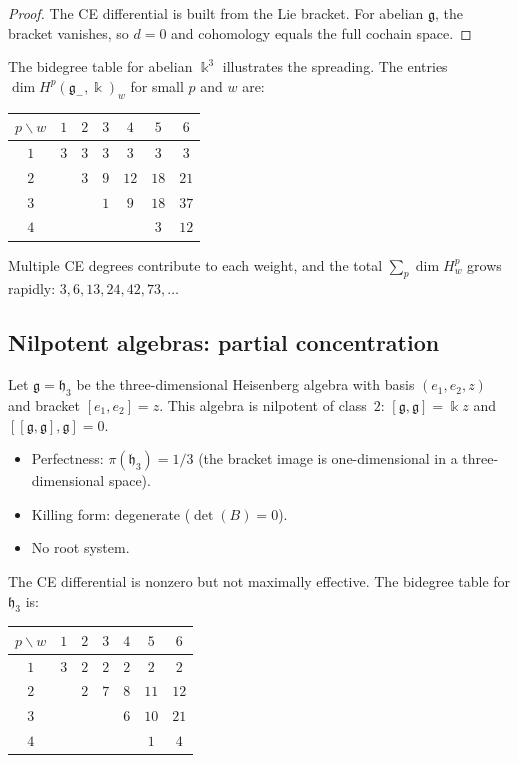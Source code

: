 \documentclass[11pt,reqno]{amsart}
\theoremstyle{plain}
\theoremstyle{definition}
\theoremstyle{remark}
\newcommand{\fg}{\mathfrak{g}}
\newcommand{\fh}{\mathfrak{h}}
\newcommand{\gminus}{\fg_{-}}
\newcommand{\kk}{\Bbbk}
\begin{document}
\begin{proof}
 The CE differential is built from the Lie bracket. For abelian $\fg$,
 the bracket vanishes, so $d = 0$ and cohomology equals the full cochain
 space.
\end{proof}

The bidegree table for abelian $\kk^3$ illustrates the spreading. The
entries $\dim H^p(\gminus,\kk)_w$ for small $p$ and $w$ are:

\begin{center}
 \begin{tabular}{c|cccccc}
 \toprule
 $p \backslash w$ & $1$ & $2$ & $3$ & $4$ & $5$ & $6$ \\
 \midrule
 $1$ & $3$ & $3$ & $3$ & $3$ & $3$ & $3$ \\
 $2$ & & $3$ & $9$ & $12$ & $18$ & $21$ \\
 $3$ & & & $1$ & $9$ & $18$ & $37$ \\
 $4$ & & & & & $3$ & $12$ \\
 \bottomrule
 \end{tabular}
\end{center}

\noindent
Multiple CE degrees contribute to each weight, and the total
$\sum_p \dim H^p_w$ grows rapidly: $3, 6, 13, 24, 42, 73, \ldots$


\subsection{Nilpotent algebras: partial concentration}
\label{sec:nilpotent}

Let $\fg = \fh_3$ be the three-dimensional Heisenberg algebra with
basis $(e_1, e_2, z)$ and bracket $[e_1, e_2] = z$. This algebra is
nilpotent of class~$2$: $[\fg, \fg] = \kk z$ and $[[\fg, \fg], \fg] = 0$.

\begin{itemize}
 \item Perfectness: $\pi(\fh_3) = 1/3$ (the bracket image is
 one-dimensional in a three-dimensional space).
 \item Killing form: degenerate ($\det(B) = 0$).
 \item No root system.
\end{itemize}

The CE differential is nonzero but not maximally effective. The bidegree
table for $\fh_3$ is:

\begin{center}
 \begin{tabular}{c|cccccc}
 \toprule
 $p \backslash w$ & $1$ & $2$ & $3$ & $4$ & $5$ & $6$ \\
 \midrule
 $1$ & $3$ & $2$ & $2$ & $2$ & $2$ & $2$ \\
 $2$ & & $2$ & $7$ & $8$ & $11$ & $12$ \\
 $3$ & & & & $6$ & $10$ & $21$ \\
 $4$ & & & & & $1$ & $4$ \\
 \bottomrule
 \end{tabular}
\end{center}
\end{document}
